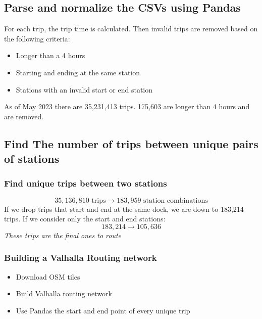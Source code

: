 \documentclass{beamer}
\begin{document}
\subsection{Parse and normalize the CSVs using Pandas}

\begin{frame}
    For each trip, the trip time is calculated. 
    Then invalid trips are removed based on the following criteria: 
    \begin{itemize}
        \item Longer than a 4 hours
              
              
        \item Starting and ending at the same station
              
              
        \item Stations with an invalid start or end station
              
    \end{itemize}
    As of May 2023 there are 35,231,413 trips. 175,603 are longer than 4 hours and are removed. 
\end{frame}

\subsection{Find The number of trips between unique pairs of stations}
\begin{frame}
    \frametitle{Find unique trips between two stations}
    $$ 35,136,810 \text{ trips} \rightarrow 183,959 \text{ station combinations} $$
    If we drop trips that start and end at the same dock, we are down to 183,214 trips.
    \smallskip
    If we consider only the start and end stations:
    $$ 183,214 \rightarrow 105,636 $$
    \emph{These trips are the final ones to route}
\end{frame}

\begin{frame}
    \frametitle{Building a Valhalla Routing network}
    \begin{itemize}
        \item Download OSM tiles
        \item Build Valhalla routing network
        \item Use Pandas the start and end point of every unique trip
    \end{itemize}
\end{frame}
\end{document}

